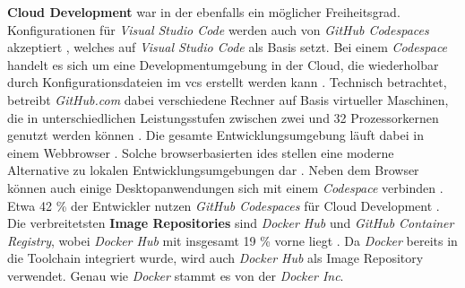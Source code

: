 \textbf{Cloud Development} war in der  ebenfalls ein möglicher Freiheitsgrad.  Konfigurationen für \textit{Visual Studio Code} werden auch von \textit{GitHub Codespaces} akzeptiert \cite{306:Development-Containers}, welches auf \textit{Visual Studio Code} als Basis setzt. Bei einem \textit{Codespace} handelt es sich um eine Developmentumgebung in der Cloud, die wiederholbar durch Konfigurationsdateien im \Gls{vcs} erstellt werden kann \cite{310:GitHub-Codespaces-Overview}. Technisch betrachtet, betreibt \textit{GitHub.com} dabei verschiedene Rechner auf Basis virtueller Maschinen, die in unterschiedlichen Leistungsstufen zwischen zwei und 32 Prozessorkernen genutzt werden können \cite{306:Development-Containers}. Die gesamte Entwicklungsumgebung läuft dabei in einem Webbrowser \cite{310:GitHub-Codespaces-Overview}. Solche browserbasierten \Glspl{ide} stellen eine moderne Alternative zu lokalen Entwicklungsumgebungen dar \cite{004:Continous-Integration-and-Development-Tool-Setup-and-Pipeline-Evolution}. Neben dem Browser können auch einige Desktopanwendungen sich mit einem \textit{Codespace} verbinden \cite{310:GitHub-Codespaces-Overview}. Etwa 42 \% der Entwickler nutzen \textit{GitHub Codespaces} für Cloud Development \cite{207:Developer-Ecosystem}. Die verbreitetsten \textbf{Image Repositories} sind \textit{Docker Hub} und \textit{GitHub Container Registry}, wobei \textit{Docker Hub} mit insgesamt 19 \% vorne liegt \cite{207:Developer-Ecosystem}. Da \textit{Docker} bereits in die Toolchain integriert wurde, wird auch \textit{Docker Hub} als Image Repository verwendet. Genau wie \textit{Docker} stammt es von der \textit{Docker Inc}.


